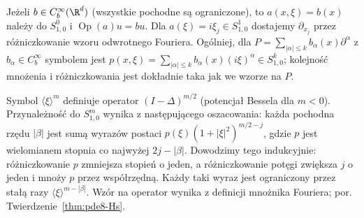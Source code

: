 \begin{przyklad}
Jeżeli $b\in C_b^\infty(\R^d)$ (wszystkie pochodne są ograniczone),
to $a(x,\xi)=b(x)$ należy do $S^0_{1,0}$ i
$\operatorname{Op}(a)u=bu$.
Dla $a(\xi)=i\xi_j\in S^1_{1,0}$ dostajemy
$\partial_{x_j}$ przez różniczkowanie wzoru
odwrotnego Fouriera. Ogólniej, dla
$P=\sum_{|\alpha|\le k}b_\alpha(x)\partial^\alpha$
z $b_\alpha\in C_b^\infty$ symbolem jest
$p(x,\xi)=\sum_{|\alpha|\le k}b_\alpha(x)(i\xi)^\alpha
\in S^k_{1,0}$; kolejność mnożenia i różniczkowania
jest dokładnie taka jak we wzorze na $P$.

Symbol $\langle\xi\rangle^m$ definiuje operator
$(I-\Delta)^{m/2}$ (potencjał Bessela dla $m<0$).
Przynależność do $S^m_{1,0}$ wynika z następującego
oszacowania: każda pochodna rzędu $|\beta|$
jest sumą wyrazów postaci
$p(\xi)(1+|\xi|^2)^{m/2-j}$, gdzie $p$
jest wielomianem stopnia co najwyżej $2j-|\beta|$.
Dowodzimy tego indukcyjnie: różniczkowanie $p$
zmniejsza stopień o jeden, a różniczkowanie potęgi
zwiększa $j$ o jeden i mnoży $p$ przez współrzędną.
Każdy taki wyraz jest ograniczony przez stałą
razy $\langle\xi\rangle^{m-|\beta|}$.
Wzór na operator wynika z definicji mnożnika
Fouriera; por. Twierdzenie~\ref{thm:pde8-Hs}.
\end{przyklad}

